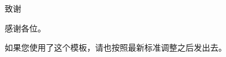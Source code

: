 \cleardoublepage 
\pagestyle{fancy}
     \fancyhf{}
	 \fancyhead{}
	 \chead{\normalfont\small\rmfamily\nouppercase{\leftmark}} 
     \fancyfoot[C]{-\,\thepage\,-}
     \renewcommand{\headrulewidth}{0.4pt}

\begin{acknowledgement}
\begin{center}
		\heiti {}致谢 \\[2em]
	\end{center}
\begin{flushleft}
\hspace{2em}

感谢各位。

如果您使用了这个模板，请也按照最新标准调整之后发出去。

\end{flushleft}
\end{acknowledgement}